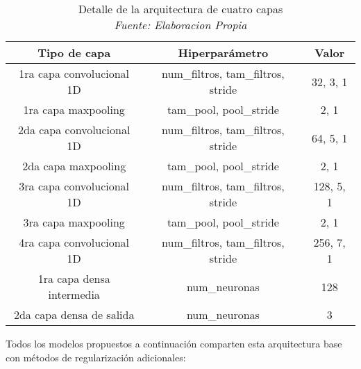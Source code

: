 \begin{table}[!ht]
	\centering
	\begin{tabular}{|c|c|c|}
		\hline
		\textbf{Tipo de capa} & \textbf{Hiperparámetro} & \textbf{Valor} \\ \hline
		1ra capa convolucional 1D & num\_filtros, tam\_filtros, stride & 32, 3, 1 \\ \hline
		1ra capa maxpooling & tam\_pool, pool\_stride & 2, 1 \\ \hline
		2da capa convolucional 1D & num\_filtros, tam\_filtros, stride & 64, 5, 1 \\ \hline
		2da capa maxpooling & tam\_pool, pool\_stride & 2, 1 \\ \hline
		3ra capa convolucional 1D & num\_filtros, tam\_filtros, stride & 128, 5, 1 \\ \hline
		3ra capa maxpooling & tam\_pool, pool\_stride & 2, 1 \\ \hline
		4ra capa convolucional 1D & num\_filtros, tam\_filtros, stride & 256, 7, 1 \\ \hline
		1ra capa densa intermedia & num\_neuronas & 128 \\ \hline
		2da capa densa de salida & num\_neuronas & 3 \\ \hline
	\end{tabular}
	\caption{Detalle de la arquitectura de cuatro capas
	\\\textit{Fuente: Elaboracion Propia}}
	\label{tbl:9}
\end{table}

Todos los modelos propuestos a continuación comparten esta arquitectura base con métodos de regularización adicionales:

